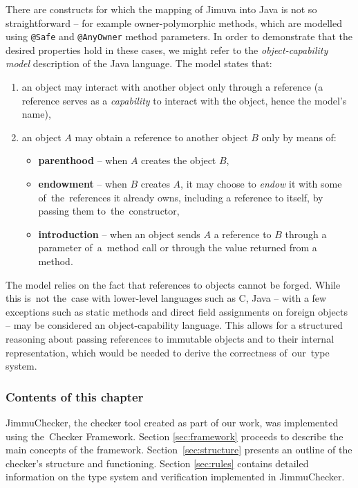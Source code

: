 \documentclass{pracamgr}
\theoremstyle{break}
\theoremstyle{break}
\theoremstyle{break}
\begin{document}
There are constructs for which the mapping of Jimuva into Java is not
so straightforward -- for example owner-polymorphic methods, which are
modelled using \texttt{@Safe} and \texttt{@AnyOwner} method
parameters. In order to demonstrate that the desired properties hold
in these cases, we might refer to the \emph{object-capability model}
description \cite{object-cap} of the Java language. The model states
that:
\begin{enumerate}
\item an object may interact with another object only through a
  reference (a reference serves as a \emph{capability} to interact
  with the object, hence the model's name),
\item an object $A$ may obtain a reference to another object $B$ only
  by means of:
  \begin{itemize}
  \item \textbf{parenthood} -- when $A$ creates the object $B$, 
  \item \textbf{endowment} -- when $B$ creates $A$, it may choose to
    \emph{endow} it with some of~the~re\-fe\-ren\-ces it already owns,
    including a reference to itself, by passing them
    to~the~constructor,
  \item \textbf{introduction} -- when an object sends $A$ a reference
    to $B$ through a parameter of~a~method call or through the value
    returned from a method.
  \end{itemize}
\end{enumerate}
The model relies on the fact that references to objects cannot be
forged. While this is~not the~case with lower-level languages such as
C, Java -- with a few exceptions such as static methods and direct
field assignments on foreign objects -- may be considered an
object-capability language. This allows for a structured reasoning
about passing references to immutable objects and to their internal
representation, which would be needed to derive the correctness
of~our~type system.

\subsubsection{Contents of this chapter}

JimmuChecker, the checker tool created as part of our work, was
implemented using the~Checker Framework. Section \ref{sec:framework}
proceeds to describe the main concepts of the
framework. Section~\ref{sec:structure} presents an outline of the
checker's structure and functioning.  Section \ref{sec:rules} contains
detailed information on the type system and verification implemented
in JimmuChecker.
\end{document}
